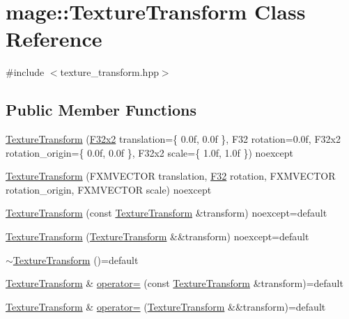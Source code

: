 \hypertarget{classmage_1_1_texture_transform}{}\section{mage\+:\+:Texture\+Transform Class Reference}
\label{classmage_1_1_texture_transform}


{\ttfamily \#include $<$texture\+\_\+transform.\+hpp$>$}

\subsection*{Public Member Functions}
\begin{DoxyCompactItemize}
\item 
\mbox{\hyperlink{classmage_1_1_texture_transform_ab473e1998fac7a7d03093d9e7f6ad210}{Texture\+Transform}} (\mbox{\hyperlink{namespacemage_aee4759dedc8def6c6dec26b5c7eddf29}{F32x2}} translation=\{ 0.\+0f, 0.\+0f \}, F32 rotation=0.\+0f, F32x2 rotation\+\_\+origin=\{ 0.\+0f, 0.\+0f \}, F32x2 scale=\{ 1.\+0f, 1.\+0f \}) noexcept
\item 
\mbox{\hyperlink{classmage_1_1_texture_transform_aab4c14bc8bca53e7cd7bed33a9cb45e4}{Texture\+Transform}} (F\+X\+M\+V\+E\+C\+T\+OR translation, \mbox{\hyperlink{namespacemage_aa97e833b45f06d60a0a9c4fc22ae02c0}{F32}} rotation, F\+X\+M\+V\+E\+C\+T\+OR rotation\+\_\+origin, F\+X\+M\+V\+E\+C\+T\+OR scale) noexcept
\item 
\mbox{\hyperlink{classmage_1_1_texture_transform_a7b3cd0015adefa9cf8475f55bb83764a}{Texture\+Transform}} (const \mbox{\hyperlink{classmage_1_1_texture_transform}{Texture\+Transform}} \&transform) noexcept=default
\item 
\mbox{\hyperlink{classmage_1_1_texture_transform_a37e8d4155e7c2bd4e8ebf282c855e2ae}{Texture\+Transform}} (\mbox{\hyperlink{classmage_1_1_texture_transform}{Texture\+Transform}} \&\&transform) noexcept=default
\item 
\mbox{\hyperlink{classmage_1_1_texture_transform_afb608ccc7bc107b893ea68937529a901}{$\sim$\+Texture\+Transform}} ()=default
\item 
\mbox{\hyperlink{classmage_1_1_texture_transform}{Texture\+Transform}} \& \mbox{\hyperlink{classmage_1_1_texture_transform_a0166da366dcf3054db133dda5867cf87}{operator=}} (const \mbox{\hyperlink{classmage_1_1_texture_transform}{Texture\+Transform}} \&transform)=default
\item 
\mbox{\hyperlink{classmage_1_1_texture_transform}{Texture\+Transform}} \& \mbox{\hyperlink{classmage_1_1_texture_transform_a82adfc646b3467f33d92f7f2e24bf28e}{operator=}} (\mbox{\hyperlink{classmage_1_1_texture_transform}{Texture\+Transform}} \&\&transform)=default

\end{DoxyCompactItemize}
